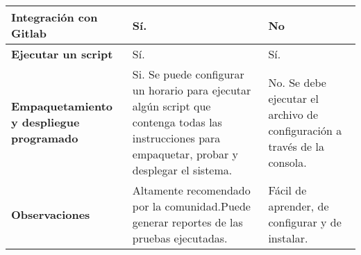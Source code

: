 \begin{table}[h]
\begin{tabular}{| p{} | p{} | p{} |}
\textbf{Integración con Gitlab}                  & Sí.                                                                                                                                                & No                                                                                                                                                           \\ \hline
\textbf{Ejecutar un script}                      & Sí.                                                                                                                                                & Sí.                                                                                                                                                          \\ \hline
\textbf{Empaquetamiento y despliegue programado} & Si. Se puede configurar un horario para ejecutar algún script que contenga todas las instrucciones para empaquetar, probar y desplegar el sistema. & No. Se debe ejecutar el archivo de configuración a través de la consola.                                                                                     \\ \hline
\textbf{Observaciones}                           & Altamente recomendado por la comunidad.Puede generar reportes de las pruebas ejecutadas.                                                           & Fácil de aprender, de configurar y de instalar.                                                                                                              \\ \hline
\end{tabular}
\end{table}
